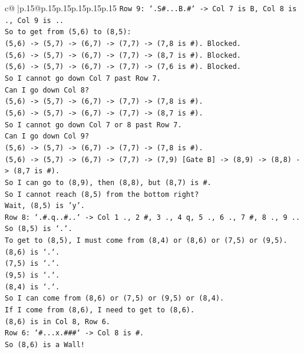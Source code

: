 \documentclass{article}
\begin{document}
{\begin{supertabular}{c@{$\;$}|p{.15\linewidth}@{}p{.15\linewidth}p{.15\linewidth}p{.15\linewidth}p{.15\linewidth}p{.15\linewidth}}
{{{\texttt{Row 9: `.S\#...B.\#` {-}> Col 7 is B, Col 8 is ., Col 9 is ..} \\
\texttt{So to get from (5,6) to (8,5):} \\
\texttt{(5,6) {-}> (5,7) {-}> (6,7) {-}> (7,7) {-}> (7,8 is \#). Blocked.} \\
\texttt{(5,6) {-}> (5,7) {-}> (6,7) {-}> (7,7) {-}> (8,7 is \#). Blocked.} \\
\texttt{(5,6) {-}> (5,7) {-}> (6,7) {-}> (7,7) {-}> (7,6 is \#). Blocked.} \\
\texttt{So I cannot go down Col 7 past Row 7.} \\
\texttt{Can I go down Col 8?} \\
\texttt{(5,6) {-}> (5,7) {-}> (6,7) {-}> (7,7) {-}> (7,8 is \#).} \\
\texttt{(5,6) {-}> (5,7) {-}> (6,7) {-}> (7,7) {-}> (8,7 is \#).} \\
\texttt{So I cannot go down Col 7 or 8 past Row 7.} \\
\texttt{Can I go down Col 9?} \\
\texttt{(5,6) {-}> (5,7) {-}> (6,7) {-}> (7,7) {-}> (7,8 is \#).} \\
\texttt{(5,6) {-}> (5,7) {-}> (6,7) {-}> (7,7) {-}> (7,9) {[}Gate B{]} {-}> (8,9) {-}> (8,8) {-}> (8,7 is \#).} \\
\texttt{So I can go to (8,9), then (8,8), but (8,7) is \#.} \\
\texttt{So I cannot reach (8,5) from the bottom right?} \\
\texttt{Wait, (8,5) is 'y'.} \\
\texttt{Row 8: `.\#.q..\#..` {-}> Col 1 ., 2 \#, 3 ., 4 q, 5 ., 6 ., 7 \#, 8 ., 9 ..} \\
\texttt{So (8,5) is `.`.} \\
\texttt{To get to (8,5), I must come from (8,4) or (8,6) or (7,5) or (9,5).} \\
\texttt{(8,6) is `.`.} \\
\texttt{(7,5) is `.`.} \\
\texttt{(9,5) is `.`.} \\
\texttt{(8,4) is `.`.} \\
\texttt{So I can come from (8,6) or (7,5) or (9,5) or (8,4).} \\
\texttt{If I come from (8,6), I need to get to (8,6).} \\
\texttt{(8,6) is in Col 8, Row 6.} \\
\texttt{Row 6: `\#...x.\#\#\#` {-}> Col 8 is \#.} \\
\texttt{So (8,6) is a Wall!} \\
}}}
\end{supertabular}}
\end{document}
